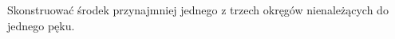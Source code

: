 \begin{geoconstruction}
    \label{delta_2024_12_end}
    Skonstruować środek przynajmniej jednego z trzech okręgów nienależących do jednego pęku.
\end{geoconstruction}

% 

% 



% 
% 
% 


% 

% 


